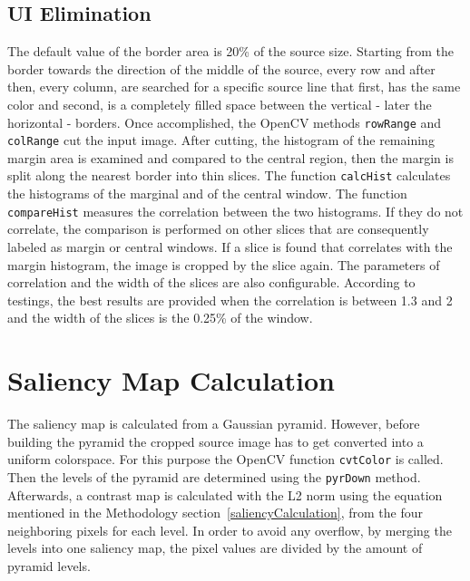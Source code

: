 \documentclass[draft,final]{vutinfth} %
\begin{document}
	\subsection{UI Elimination}
	The default value of the border area is 20\% of the source size. 
	Starting from the border towards the direction of the middle of the source, every row and after then, every column, are searched for a specific source line that first, has the same color and second, is a completely filled space between the vertical - later the horizontal - borders.
	Once accomplished, the OpenCV methods \texttt{rowRange} and \texttt{colRange} cut the input image.
	After cutting, the histogram of the remaining margin area is examined and compared to the central region, then the margin is split along the nearest border into thin slices.
	The function \texttt{calcHist} calculates the histograms of the marginal and of the central window.
	The function \texttt{compareHist} measures the correlation between the two histograms. 
	If they do not correlate, the comparison is performed on other slices that are consequently labeled as margin or central windows.
	If a slice is found that correlates with the margin histogram, the image is cropped by the slice again. 
	The parameters of correlation and the width of the slices are also configurable.
	According to testings, the best results are provided when the correlation is between 1.3 and 2 and the width of the slices is the 0.25\% of the window.
	
	\section{Saliency Map Calculation}
	The saliency map is calculated from a Gaussian pyramid.
	However, before building the pyramid the cropped source image has to get converted into a uniform colorspace.
	For this purpose the OpenCV function \texttt{cvtColor} is called.
	Then the levels of the pyramid are determined using the \texttt{pyrDown} method.
	Afterwards, a contrast map is calculated with the L2 norm using the equation mentioned in the Methodology section~\ref{saliencyCalculation}, from the four neighboring pixels for each level.
	In order to avoid any overflow, by merging the levels into one saliency map, the pixel values are divided by the amount of pyramid levels.
	
\end{document}
